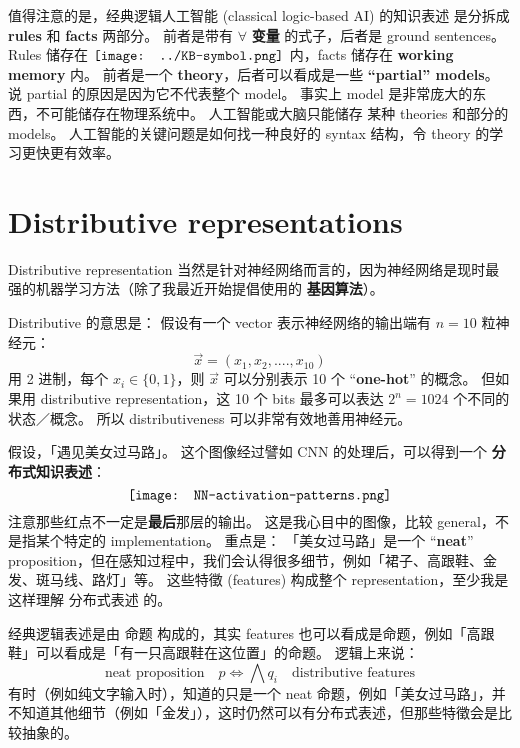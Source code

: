 \documentclass[12pt, orivec]{article}
\newcommand*\KB{\vcenter{\hbox{\texttt{[image: ../KB-symbol.png]}}}}
\begin{document}
值得注意的是，经典逻辑人工智能 (classical logic-based AI) 的知识表述 是分拆成 \textbf{rules} 和 \textbf{facts} 两部分。 前者是带有 $\forall$ \textbf{变量} 的式子，后者是 ground sentences。  Rules 储存在 $\KB$ 内，facts 储存在 \textbf{working memory} 内。 前者是一个 \textbf{theory}，后者可以看成是一些 \textbf{``partial'' models}。  说 partial 的原因是因为它不代表整个 model。  事实上 model 是非常庞大的东西，不可能储存在物理系统中。  人工智能或大脑只能储存 某种 theories 和部分的 models。  人工智能的关键问题是如何找一种良好的 syntax 结构，令 theory 的学习更快更有效率。 

\section{Distributive representations}

Distributive representation 当然是针对神经网络而言的，因为神经网络是现时最强的机器学习方法（除了我最近开始提倡使用的 \textbf{基因算法}）。

Distributive 的意思是： 假设有一个 vector 表示神经网络的输出端有 $n = 10$ 粒神经元：
\begin{equation}
\vec{x} = (x_1, x_2, .... , x_{10})
\end{equation}
用 2 进制，每个 $x_i \in \{ 0, 1 \}$，则 $\vec{x}$ 可以分别表示 10 个 ``\textbf{one-hot}'' 的概念。  但如果用 distributive representation，这 10 个 bits 最多可以表达 $2^n = 1024$ 个不同的状态／概念。  所以 distributiveness 可以非常有效地善用神经元。

假设，「遇见美女过马路」。 这个图像经过譬如 CNN 的处理后，可以得到一个 \textbf{分布式知识表述}：
\begin{equation}
\vcenter{\hbox{\texttt{[image: NN-activation-patterns.png]}}}
\end{equation}
注意那些红点不一定是\textbf{最后}那层的输出。  这是我心目中的图像，比较 general，不是指某个特定的 implementation。  重点是： 「美女过马路」是一个 ``\textbf{neat}'' proposition，但在感知过程中，我们会认得很多细节，例如「裙子、高跟鞋、金发、斑马线、路灯」等。  这些特徵 (features) 构成整个 representation，至少我是这样理解 分布式表述 的。

经典逻辑表述是由 命题 构成的，其实 features 也可以看成是命题，例如「高跟鞋」可以看成是「有一只高跟鞋在这位置」的命题。 逻辑上来说：
\begin{equation}
\boxed{\mbox{neat proposition}} \quad p \Leftrightarrow \bigwedge q_i \quad \boxed{\mbox{distributive features}}
\end{equation}
有时（例如纯文字输入时），知道的只是一个 neat 命题，例如「美女过马路」，并不知道其他细节（例如「金发」），这时仍然可以有分布式表述，但那些特徵会是比较抽象的。
\end{document}
